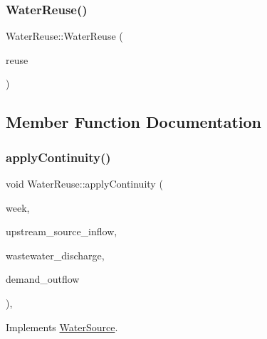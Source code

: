 \mbox{\label{classWaterReuse_abe522bfe68c8b0bd05c4e608f3f6e6ba}} 
\subsubsection{\texorpdfstring{Water\+Reuse()}{WaterReuse()}\hspace{0.1cm}{\footnotesize\ttfamily [3/3]}}
{\footnotesize\ttfamily Water\+Reuse\+::\+Water\+Reuse (\begin{DoxyParamCaption}\item[{const \mbox{\hyperlink{classWaterReuse}{Water\+Reuse}} \&}]{reuse }\end{DoxyParamCaption})}



\subsection{Member Function Documentation}
\mbox{\label{classWaterReuse_ab8ffb10c69790047a3a5dda66cfaf3ee}} 
\subsubsection{\texorpdfstring{apply\+Continuity()}{applyContinuity()}}
{\footnotesize\ttfamily void Water\+Reuse\+::apply\+Continuity (\begin{DoxyParamCaption}\item[{int}]{week,  }\item[{double}]{upstream\+\_\+source\+\_\+inflow,  }\item[{double}]{wastewater\+\_\+discharge,  }\item[{vector$<$ double $>$ \&}]{demand\+\_\+outflow }\end{DoxyParamCaption})\hspace{0.3cm}{\ttfamily [override]}, {\ttfamily [virtual]}}



Implements \mbox{\hyperlink{classWaterSource_ac070445379fe706f65b977dade4f3fbc}{Water\+Source}}.

\mbox{\label{classWaterReuse_a78c905f77ca46fbbb2251f9cfa9a04de}} 
